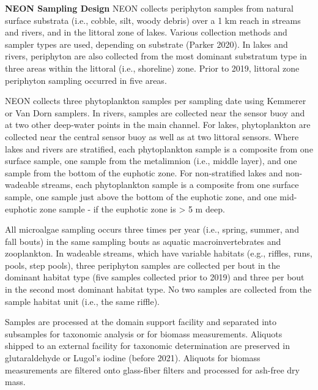\documentclass[
  12pt,
]{article}
\begin{document}
\textbf{NEON Sampling Design} NEON collects periphyton samples from natural surface substrata (i.e., cobble, silt, woody debris) over a 1 km reach in streams and rivers, and in the littoral zone of lakes. Various collection methods and sampler types are used, depending on substrate (Parker 2020). In lakes and rivers, periphyton are also collected from the most dominant substratum type in three areas within the littoral (i.e., shoreline) zone. Prior to 2019, littoral zone periphyton sampling occurred in five areas.

NEON collects three phytoplankton samples per sampling date using Kemmerer or Van Dorn samplers. In rivers, samples are collected near the sensor buoy and at two other deep-water points in the main channel. For lakes, phytoplankton are collected near the central sensor buoy as well as at two littoral sensors. Where lakes and rivers are stratified, each phytoplankton sample is a composite from one surface sample, one sample from the metalimnion (i.e., middle layer), and one sample from the bottom of the euphotic zone. For non-stratified lakes and non-wadeable streams, each phytoplankton sample is a composite from one surface sample, one sample just above the bottom of the euphotic zone, and one mid-euphotic zone sample - if the euphotic zone is \textgreater{} 5 m deep.

All microalgae sampling occurs three times per year (i.e., spring, summer, and fall bouts) in the same sampling bouts as aquatic macroinvertebrates and zooplankton. In wadeable streams, which have variable habitats (e.g., riffles, runs, pools, step pools), three periphyton samples are collected per bout in the dominant habitat type (five samples collected prior to 2019) and three per bout in the second most dominant habitat type. No two samples are collected from the sample habitat unit (i.e., the same riffle).

Samples are processed at the domain support facility and separated into subsamples for taxonomic analysis or for biomass measurements. Aliquots shipped to an external facility for taxonomic determination are preserved in glutaraldehyde or Lugol's iodine (before 2021). Aliquots for biomass measurements are filtered onto glass-fiber filters and processed for ash-free dry mass.
\end{document}
